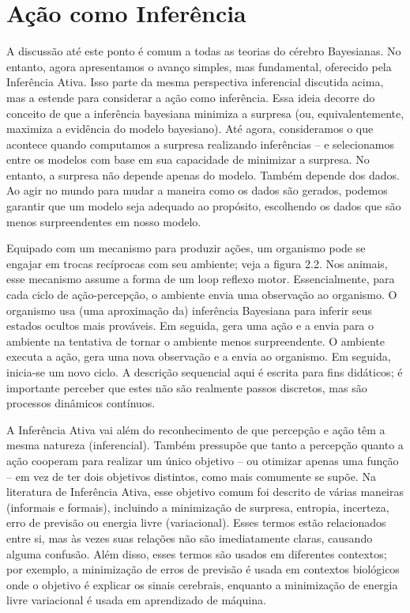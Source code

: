 \documentclass[
  12pt,
]{book}
\begin{document}
\hypertarget{auxe7uxe3o-como-inferuxeancia}{%
\section{Ação como Inferência}\label{auxe7uxe3o-como-inferuxeancia}}

A discussão até este ponto é comum a todas as teorias do cérebro Bayesianas. No entanto, agora apresentamos o avanço simples, mas fundamental, oferecido pela Inferência Ativa. Isso parte da mesma perspectiva inferencial discutida acima, mas a estende para considerar a ação como inferência. Essa ideia decorre do conceito de que a inferência bayesiana minimiza a surpresa (ou, equivalentemente, maximiza a evidência do modelo bayesiano). Até agora, consideramos o que acontece quando computamos a surpresa realizando inferências -- e selecionamos entre os modelos com base em sua capacidade de minimizar a surpresa. No entanto, a surpresa não depende apenas do modelo. Também depende dos dados. Ao agir no mundo para mudar a maneira como os dados são gerados, podemos garantir que um modelo seja adequado ao propósito, escolhendo os dados que são menos surpreendentes em nosso modelo.

Equipado com um mecanismo para produzir ações, um organismo pode se engajar em trocas recíprocas com seu ambiente; veja a figura 2.2. Nos animais, esse mecanismo assume a forma de um loop reflexo motor. Essencialmente, para cada ciclo de ação-percepção, o ambiente envia uma observação ao organismo. O organismo usa (uma aproximação da) inferência Bayesiana para inferir seus estados ocultos mais prováveis. Em seguida, gera uma ação e a envia para o ambiente na tentativa de tornar o ambiente menos surpreendente. O ambiente executa a ação, gera uma nova observação e a envia ao organismo. Em seguida, inicia-se um novo ciclo. A descrição sequencial aqui é escrita para fins didáticos; é importante perceber que estes não são realmente passos discretos, mas são processos dinâmicos contínuos.

A Inferência Ativa vai além do reconhecimento de que percepção e ação têm a mesma natureza (inferencial). Também pressupõe que tanto a percepção quanto a ação cooperam para realizar um único objetivo -- ou otimizar apenas uma função -- em vez de ter dois objetivos distintos, como mais comumente se supõe. Na literatura de Inferência Ativa, esse objetivo comum foi descrito de várias maneiras (informais e formais), incluindo a minimização de surpresa, entropia, incerteza, erro de previsão ou energia livre (variacional). Esses termos estão relacionados entre si, mas às vezes suas relações não são imediatamente claras, causando alguma confusão. Além disso, esses termos são usados em diferentes contextos; por exemplo, a minimização de erros de previsão é usada em contextos biológicos onde o objetivo é explicar os sinais cerebrais, enquanto a minimização de energia livre variacional é usada em aprendizado de máquina.
\end{document}
